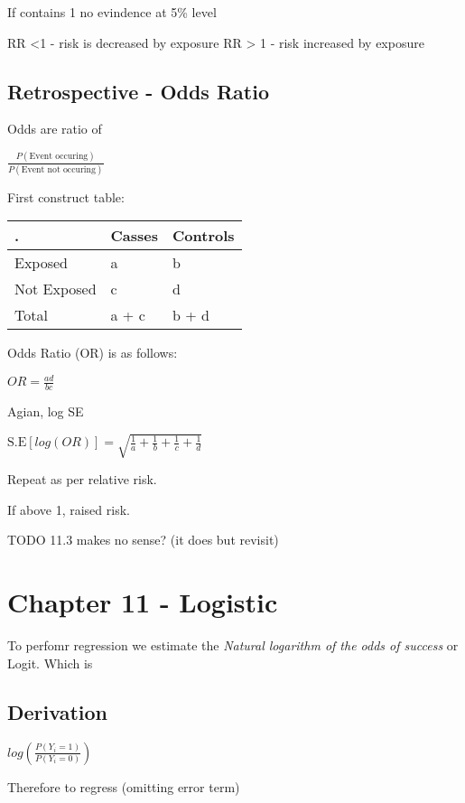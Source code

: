\documentclass[
  letterpaper,
  DIV=11,
  numbers=noendperiod]{scrreprt}
\begin{document}
If contains 1 no evindence at 5\% level

RR \textless1 - risk is decreased by exposure RR \textgreater{} 1 - risk
increased by exposure

\hypertarget{retrospective---odds-ratio}{%
\subsection{Retrospective - Odds
Ratio}\label{retrospective---odds-ratio}}

Odds are ratio of

\(\frac{P(\text{Event occuring})}{P(\text{Event not occuring})}\)

First construct table:

\begin{longtable}[]{@{}lll@{}}
\toprule()
. & Casses & Controls \\
\midrule()
\endhead
Exposed & a & b \\
Not Exposed & c & d \\
Total & a + c & b + d \\
\bottomrule()
\end{longtable}

Odds Ratio (OR) is as follows:

\(OR = \frac{ad}{bc}\)

Agian, log SE

\(\text{S.E}[log(OR)] = \sqrt{  \frac{1}{a} +  \frac{1}{b}+  \frac{1}{c}+  \frac{1}{d} }\)

Repeat as per relative risk.

If above 1, raised risk.

TODO 11.3 makes no sense? (it does but revisit)

\hypertarget{chapter-11---logistic}{%
\section{Chapter 11 - Logistic}\label{chapter-11---logistic}}

To perfomr regression we estimate the \emph{Natural logarithm of the
odds of success} or Logit. Which is

\hypertarget{derivation}{%
\subsection{Derivation}\label{derivation}}

\(log(\frac{P(Y_i = 1)}{P(Y_i = 0)})\)

Therefore to regress (omitting error term)
\end{document}
